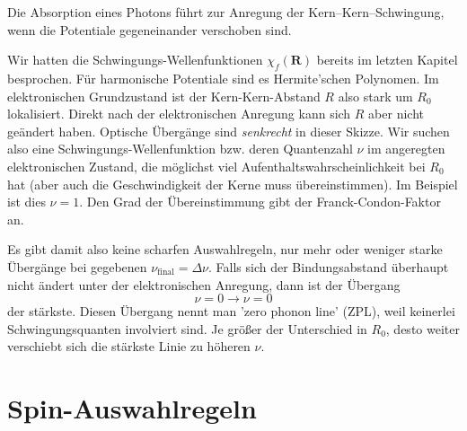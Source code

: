 \begin{marginfigure}
\caption{Die Absorption eines Photons führt zur Anregung der Kern--Kern--Schwingung, wenn die Potentiale gegeneinander verschoben sind.}
\end{marginfigure}

Wir hatten die Schwingungs-Wellenfunktionen $\chi_f(\mathbf{R})$ bereits im letzten Kapitel  besprochen. Für harmonische Potentiale sind es Hermite'schen Polynomen. Im elektronischen Grundzustand ist der Kern-Kern-Abstand $R$ also stark um $R_0$ lokalisiert. Direkt nach der elektronischen Anregung kann sich $R$ aber nicht geändert haben. Optische Übergänge sind \emph{senkrecht} in dieser Skizze. Wir suchen also eine Schwingungs-Wellenfunktion bzw. deren Quantenzahl $\nu$ im angeregten elektronischen Zustand, die möglichst viel Aufenthaltswahrscheinlichkeit bei $R_0$ hat (aber auch die Geschwindigkeit der Kerne muss übereinstimmen). Im Beispiel ist dies $\nu = 1$. Den Grad der Übereinstimmung gibt der Franck-Condon-Faktor an.

Es gibt damit also keine scharfen Auswahlregeln, nur mehr oder weniger starke Übergänge bei gegebenen $\nu_\text{final}  = \Delta \nu$. Falls sich der Bindungsabstand überhaupt nicht ändert unter der elektronischen Anregung, dann ist der Übergang
\begin{equation}
 \nu = 0 \rightarrow \nu = 0
\end{equation}
der stärkste. Diesen Übergang nennt man 'zero phonon line' (ZPL), weil keinerlei Schwingungsquanten involviert sind. Je größer der Unterschied in $R_0$, desto weiter verschiebt sich die stärkste Linie zu höheren $\nu$. 



\section{Spin-Auswahlregeln }

